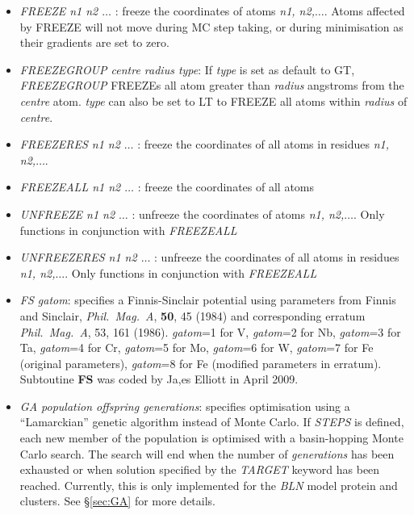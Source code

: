 \documentclass[12pt,a4paper,dvips]{article}
\begin{document}
\begin{itemize}
\item {\it FREEZE n1 n2 $\ldots$ \/}: freeze the coordinates of atoms {\it n1, n2,$\ldots$}. Atoms affected by FREEZE will not move during MC step taking, 
or during minimisation as their gradients are set to zero.

\item {\it FREEZEGROUP centre radius type\/}: If {\it type} is set as default to {\textrm GT}, {\it FREEZEGROUP\/} FREEZEs all atom greater than {\it radius} angstroms from the {\it centre} atom. {\it type} can also be set to LT to FREEZE all atoms within {\it radius} of {\it centre}.

\item {\it FREEZERES n1 n2 $\ldots$ \/}: freeze the coordinates of all atoms in residues {\it n1, n2,$\ldots$}.

\item {\it FREEZEALL n1 n2 $\ldots$ \/}: freeze the coordinates of all atoms 

\item {\it UNFREEZE n1 n2 $\ldots$ \/}: unfreeze the coordinates of atoms {\it n1, n2,$\ldots$}. Only functions in conjunction with 
{\it FREEZEALL\/}

\item {\it UNFREEZERES n1 n2 $\ldots$ \/}: unfreeze the coordinates of all atoms in residues {\it n1, n2,$\ldots$}. Only functions in conjunction with 
{\it FREEZEALL\/}

\item{\it FS gatom}: specifies a Finnis-Sinclair potential using parameters from 
Finnis and Sinclair, {\it Phil.~Mag.~A}, {\bf 50}, 45 (1984) 
and corresponding erratum {\it Phil.~Mag.~A}, 53, 161 (1986). 
{\it gatom}=1 for V, {\it gatom}=2 for Nb, {\it gatom}=3 for Ta, {\it gatom}=4 
for Cr, {\it gatom}=5 for Mo, {\it gatom}=6 for W, {\it gatom}=7 
for Fe (original parameters), {\it gatom}=8 for Fe (modified parameters in erratum). 
Subtoutine {\bf FS} was coded by Ja,es Elliott in April 2009.

\item {\it GA population offspring generations}: specifies optimisation using a
``Lamarckian'' genetic algorithm\cite{Johnston03} instead of Monte Carlo. If
{\it STEPS} is defined, each new member of the population is optimised with a
basin-hopping Monte Carlo search. The search will end when the number
of {\it generations} has been exhausted or when solution specified by
the {\it TARGET} keyword has been reached. Currently, this is only implemented
for the {\it BLN\/} model protein and clusters. See \S \ref{sec:GA} for more
details.


\end{itemize}
\end{document}
